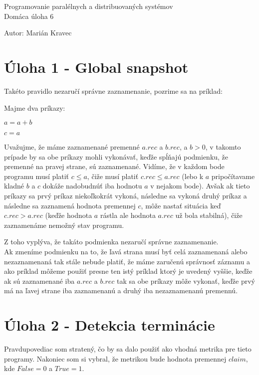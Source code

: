 \documentclass[a4paper]{article}
\begin{document}
 
	
\pagestyle{plain}

\begin{center}
	\sc\large
	Programovanie paralélnych a distribuovaných systémov\\
	Domáca úloha 6
\end{center}

Autor: Marián Kravec

\section{Úloha 1 - Global snapshot}

Takéto pravidlo nezaručí správne zaznamenanie, pozrime sa na príklad:

Majme dva príkazy:

$a = a + b$

$c = a$

Uvažujme, že máme zaznamenané premenné $a.rec$ a $b.rec$, a $b > 0$, v takomto prípade by sa obe príkazy mohli vykonávať, keďže spĺňajú podmienku, že premenné na pravej strane, sú zaznamenané. Vidíme, že v každom bode programu musí platiť $c \leq a$, čiže musí platiť $c.rec \leq a.rec$ (lebo k $a$ pripočítavame kladné $b$ a $c$ dokáže nadobudnúť iba hodnotu $a$ v nejakom bode). Avšak ak tieto príkazy sa prvý príkaz niekoľkokrát vykoná, následne sa vykoná druhý príkaz a následne sa zaznamená hodnota premennej $c$, môže nastať situácia keď $c.rec > a.rec$ (keďže hodnota $a$ rástla ale hodnota $a.rec$ už bola stabilná), čiže zaznamenáme nemožný stav programu.

Z toho vyplýva, že takáto podmienka nezaručí správne zaznamenanie.
\\

Ak zmeníme podmienku na to, že ľavá strana musí byť celá zaznamenaná alebo nezaznamenaná tak stále nebude platiť, že máme zaručenú správnosť záznamu a ako príklad môžeme použiť presne ten istý príklad ktorý je uvedený vyššie, keďže ak sú zaznamenané iba $a.rec$ a $b.rec$ tak sa obe príkazy môže vykonať, keďže prvý má na ľavej strane iba zaznamenanú a druhý iba nezaznamenanú premennú.

\section{Úloha 2 - Detekcia terminácie}

Pravdupovediac som stratený, čo by sa dalo použiť ako vhodná metrika pre tieto programy. Nakoniec som si vybral, že metrikou bude hodnota premennej $claim$, kde $False=0$ a $True=1$.
\\
\end{document}
